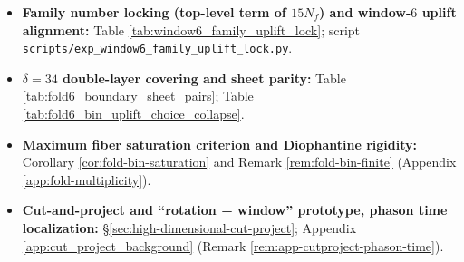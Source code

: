 \begin{itemize}
  \S\ref{subsec:bdry-tower-zeck-gut}; Table \ref{tab:zeckendorf_gut_signatures}; script \texttt{scripts/exp\_boundary\_tower\_gut\_signatures.py}.
  \item \textbf{Family number locking (top-level term of \(15N_f\)) and window-\(6\) uplift alignment:}
  Table \ref{tab:window6_family_uplift_lock}; script \texttt{scripts/exp\_window6\_family\_uplift\_lock.py}.
  \item \textbf{\(\delta=34\) double-layer covering and sheet parity:}
  Table \ref{tab:fold6_boundary_sheet_pairs}; Table \ref{tab:fold6_bin_uplift_choice_collapse}.
  \item \textbf{Maximum fiber saturation criterion and Diophantine rigidity:}
  Corollary \ref{cor:fold-bin-saturation} and Remark \ref{rem:fold-bin-finite} (Appendix \ref{app:fold-multiplicity}).
  \item \textbf{Cut-and-project and ``rotation + window'' prototype, phason time localization:}
  \S\ref{sec:high-dimensional-cut-project}; Appendix \ref{app:cut_project_background} (Remark \ref{rem:app-cutproject-phason-time}).
\end{itemize}
